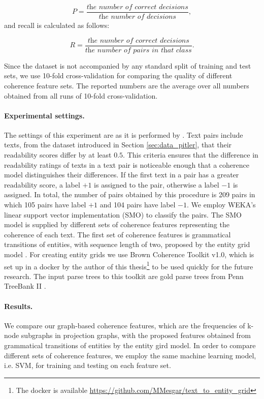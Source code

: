 \begin{equation}
P = \frac{\textit{the number of correct decisions}}{\textit{the number of decisions}},
\end{equation}
and recall is calculated as follows:

\begin{equation}
R = \frac{\textit{the number of correct decisions}}{\textit{the number of pairs in that class}}.
\end{equation}

Since the dataset is not accompanied by any standard split of training and test sets, we use 10-fold cross-validation for comparing the quality of different coherence feature sets. 
The reported numbers are the average over all numbers obtained from all runs of 10-fold cross-validation. 

\paragraph{Experimental settings.}
The settings of this experiment are as it is performed by . 
Text pairs include texts, from the dataset introduced in Section \ref{sec:data_pitler}, that their readability scores differ by at least $0.5$. 
This criteria ensures that the difference in readability ratings of texts in a text pair is noticeable enough that a coherence model distinguishes their differences. 
If the first text in a pair has a greater readability score, a label $+1$ is assigned to the pair, otherwise a label $-1$ is assigned. 
In total, the number of pairs obtained by this procedure is 209 pairs in which 105 pairs have label $+1$  and 104 pairs have label $-1$.  
We employ WEKA's linear support vector implementation (SMO) to classify the pairs.
The SMO model is supplied by different sets of coherence features representing the coherence of each text. 
The first set of coherence features is grammatical transitions of entities, with sequence length of two, proposed by the entity grid model \cite{barzilay05a,barzilay08}. 
For creating entity grids we use Brown Coherence Toolkit v1.0, which is set up in a docker by the author of this thesis\footnote{The docker is available \url{https://github.com/MMesgar/text_to_entity_grid}} to be used quickly for the future research. 
The input parse trees to this toolkit are gold parse trees from Penn TreeBank II \cite{marcus94}. 

\paragraph{Results.}
We compare our graph-based coherence features, which are the frequencies of \mbox{k-node} subgraphs in projection graphs, with the proposed features obtained from grammatical transitions of entities by the entity gird model. 
In order to compare different sets of coherence features, we employ the same machine learning model, i.e. SVM, for training and testing on each feature set. 

